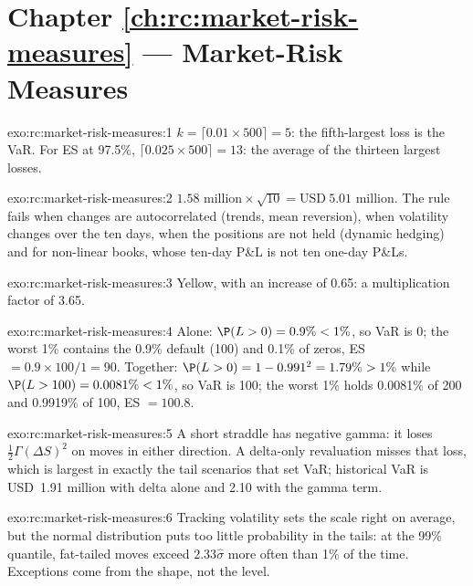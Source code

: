 \section*{Chapter \ref{ch:rc:market-risk-measures} --- Market-Risk Measures}

\begin{solution}{exo:rc:market-risk-measures:1}
$k = \lceil0.01\times500\rceil = 5$: the fifth-largest loss is the VaR. For ES at 97.5\%,
$\lceil0.025\times500\rceil = 13$: the average of the thirteen largest losses.
\end{solution}

\begin{solution}{exo:rc:market-risk-measures:2}
$1.58\text{ million}\times\sqrt{10} = \text{USD}~5.01$ million. The rule fails when changes are
autocorrelated (trends, mean reversion), when volatility changes over the ten days, when the
positions are not held (dynamic hedging) and for non-linear books, whose ten-day P\&L is not ten
one-day P\&Ls.
\end{solution}

\begin{solution}{exo:rc:market-risk-measures:3}
Yellow, with an increase of 0.65: a multiplication factor of 3.65.
\end{solution}

\begin{solution}{exo:rc:market-risk-measures:4}
Alone: $\P(L>0) = 0.9\% < 1\%$, so VaR is 0; the worst 1\% contains the 0.9\% default (100) and 0.1\%
of zeros, ES $= 0.9\times100/1 = 90$. Together: $\P(L>0) = 1-0.991^2 = 1.79\% > 1\%$ while $\P(L>100) =
0.0081\% < 1\%$, so VaR is 100; the worst 1\% holds 0.0081\% of 200 and 0.9919\% of 100, ES $= 100.8$.
\end{solution}

\begin{solution}{exo:rc:market-risk-measures:5}
A short straddle has negative gamma: it loses $\tfrac12\Gamma(\Delta S)^2$ on moves in either
direction. A delta-only revaluation misses that loss, which is largest in exactly the tail
scenarios that set VaR; historical VaR is USD~1.91 million with delta alone and 2.10 with the
gamma term.
\end{solution}

\begin{solution}{exo:rc:market-risk-measures:6}
Tracking volatility sets the scale right on average, but the normal distribution puts too
little probability in the tails: at the 99\% quantile, fat-tailed moves exceed $2.33\hat\sigma$ more
often than 1\% of the time. Exceptions come from the shape, not the level.
\end{solution}


